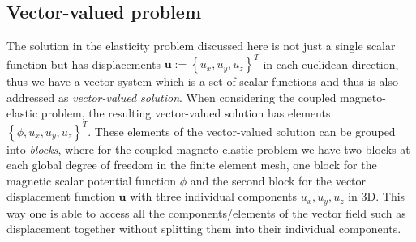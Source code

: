 \documentclass[11pt,a4paper,final]{article}
\begin{document}
\subsection{\textbf{Vector-valued problem}} The solution in the elasticity problem discussed here is not just a single scalar function but has displacements $\mathbf{u} := \left\lbrace u_x, u_y, u_z \right\rbrace^T$ in each euclidean direction, thus we have a vector system which is a set of scalar functions and thus is also addressed as \textit{vector-valued solution}. When considering the coupled magneto-elastic problem, the resulting vector-valued solution has elements $\left\lbrace \phi, u_x, u_y, u_z \right\rbrace^T$. These elements of the vector-valued solution can be grouped into \textit{blocks}, where for the coupled magneto-elastic problem we have two blocks at each global degree of freedom in the finite element mesh, one block for the magnetic scalar potential function $\phi$ and the second block for the vector displacement function $\mathbf{u}$ with three individual components $u_x, u_y, u_z$ in 3D. This way one is able to access all the components/elements of the vector field such as displacement together without splitting them into their individual components. 
\end{document}
